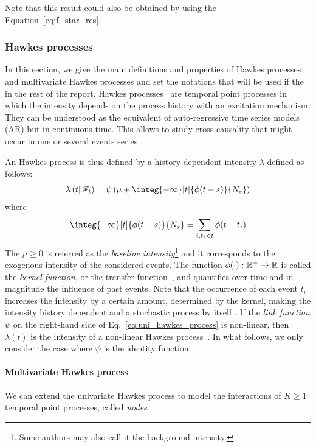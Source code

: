 Note that this result could also be obtained by using the Equation~\eqref{eq:f_star_res}.

\subsubsection{Hawkes processes}

In this section, we give the main definitions and properties of Hawkes processes and multivariate Hawkes processes and set the notations that will be used if the in the rest of the report.
Hawkes processes~\citep{hawkes1971point, hawkes1974cluster} are temporal point processes in which the intensity depends on the process history with an excitation mechanism.
They can be understood as the equivalent of auto-regressive time series models (AR) but in continuous time.
This allows to study cross causality that might occur in one or several events series~\citep{bompaire2019machine}.

An Hawkes process is thus defined by a history dependent intensity $\lambda$ defined as follows:
\begin{equation}\label{eq:uni_hawkes_process}
    \lambda\pars{t\middle| \mathscr{F}_t} = \psi\pars{\mu + \integ{-\infty}[t]{\phi(t-s)}{N_s}}
\end{equation}
where 
\begin{equation}
    \integ{-\infty}[t]{\phi(t-s)}{N_s} = \sum_{i, t_i<t} \phi(t-t_i)
\end{equation}
The $\mu \geq 0$ is referred as the \textit{baseline intensity}\footnote{Some authors may also call it the background intensity.} and it corresponds to the exogenous intensity of the considered events.
The function $\phi(\cdot):\mathbb{R}^+\to\mathbb{R}$ is called the \textit{kernel function}, or the transfer function~\citep{chen2017multivariate}, and quantifies over time and in magnitude the influence of past events.
Note that the occurrence of each event $t_i$ increases the intensity by a certain amount, determined by the kernel, making the intensity history dependent and a stochastic process by itself \citep{de2019temporal}.
If the \textit{link function} $\psi$ on the right-hand side of Eq.~\ref{eq:uni_hawkes_process} is non-linear, then $\lambda(t)$ is the intensity of a non-linear Hawkes process~\citep{bremaud1996stability}.
In what follows, we only consider the case where $\psi$ is the identity function.

\paragraph{Multivariate Hawkes process} We can extend the univariate Hawkes process to model the interactions of $K\geq 1$ temporal point processes, called \textit{nodes}.


